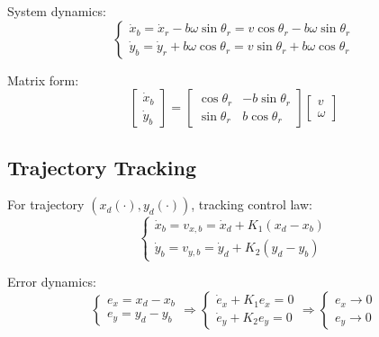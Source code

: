 \documentclass[openany]{book}
\theoremstyle{definition}
\theoremstyle{remark}
\begin{document}
System dynamics:
\begin{equation}
    \begin{cases}
        \dot{x}_b = \dot{x}_r - b\omega\sin\theta_r = v\cos\theta_r - b\omega\sin\theta_r \\
        \dot{y}_b = \dot{y}_r + b\omega\cos\theta_r = v\sin\theta_r + b\omega\cos\theta_r
    \end{cases}
\end{equation}

Matrix form:
\begin{equation}
    \begin{bmatrix}
        \dot{x}_b \\ \dot{y}_b
    \end{bmatrix} =
    \begin{bmatrix}
        \cos\theta_r & -b\sin\theta_r \\
        \sin\theta_r & b\cos\theta_r
    \end{bmatrix}
    \begin{bmatrix}
        v \\ \omega
    \end{bmatrix}
\end{equation}

\subsection{Trajectory Tracking}
For trajectory $(x_d(\cdot), y_d(\cdot))$, tracking control law:
\begin{equation}
    \begin{cases}
        \dot{x}_b = v_{x,b} = \dot{x}_d + K_1(x_d - x_b) \\
        \dot{y}_b = v_{y,b} = \dot{y}_d + K_2(y_d - y_b)
    \end{cases}
\end{equation}

Error dynamics:
\begin{equation}
    \begin{cases}
        e_x = x_d - x_b \\
        e_y = y_d - y_b
    \end{cases}
    \Rightarrow
    \begin{cases}
        \dot{e}_x + K_1e_x = 0 \\
        \dot{e}_y + K_2e_y = 0
    \end{cases}
    \Rightarrow
    \begin{cases}
        e_x \to 0 \\
        e_y \to 0
    \end{cases}
\end{equation}
\end{document}
